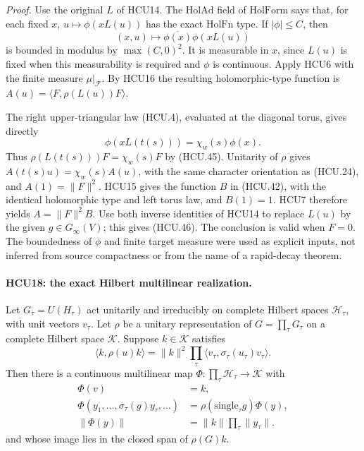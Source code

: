 \emph{Proof.}
Use the original \(L\) of HCU14.
The \(\mathrm{HolAd}\) field of \(\mathrm{HolForm}\) says that, for
each fixed \(x\),
\(u\mapsto\phi(xL(u))\) has the exact \(\mathrm{HolFn}\) type.
If \(|\phi|\le C\), then
\[
 (x,u)\longmapsto\overline{\phi(x)}\phi(xL(u))
 \tag{HCU.47}
\]
is bounded in modulus by \(\max(C,0)^2\).
It is measurable in \(x\), since \(L(u)\) is fixed when this
measurability is required and \(\phi\) is continuous.
Apply HCU6 with the finite measure \(\mu|_{\mathcal F}\).
By HCU16 the resulting holomorphic-type function is
\(A(u)=\langle F,\rho(L(u))F\rangle\).

The right upper-triangular law (HCU.4), evaluated at the diagonal
torus, gives directly
\[
 \phi(xL(t(s)))=\chi_w(s)\phi(x).
\]
Thus \(\rho(L(t(s)))F=\chi_w(s)F\) by (HCU.45).
Unitarity of \(\rho\) gives
\(A(t(s)u)=\chi_w(s)A(u)\), with the same character orientation as
(HCU.24), and \(A(1)=\|F\|^2\).
HCU15 gives the function \(B\) in (HCU.42), with the identical
holomorphic type and left torus law, and \(B(1)=1\).
HCU7 therefore yields \(A=\|F\|^2B\).
Use both inverse identities of HCU14 to replace \(L(u)\) by the
given \(g\in G_\infty(V)\); this gives (HCU.46).
The conclusion is valid when \(F=0\).
The boundedness of \(\phi\) and finite target measure were used as
explicit inputs, not inferred from source compactness or from the
name of a rapid-decay theorem.

\paragraph{HCU18: the exact Hilbert multilinear realization.}
\label{claim:HCU18}
Let \(G_\tau=U(H_\tau)\) act unitarily and irreducibly on complete
Hilbert spaces \(\mathcal H_\tau\), with unit vectors \(v_\tau\).
Let \(\rho\) be a unitary representation of
\(G=\prod_\tau G_\tau\) on a complete Hilbert space \(\mathcal K\).
Suppose \(k\in\mathcal K\) satisfies
\[
 \langle k,\rho(u)k\rangle
  =\|k\|^2\prod_\tau\langle v_\tau,\sigma_\tau(u_\tau)v_\tau\rangle .
 \tag{HCU.48}
\]
Then there is a continuous multilinear map
\(\Phi:\prod_\tau\mathcal H_\tau\to\mathcal K\) with
\[
 \begin{aligned}
 \Phi(v)&=k,\\
 \Phi(y_1,\ldots,\sigma_\tau(g)y_\tau,\ldots)
      &=\rho(\mathrm{single}_\tau g)\Phi(y),\\
 \|\Phi(y)\|&=\|k\|\prod_\tau\|y_\tau\|.
 \end{aligned}
 \tag{HCU.49}
\]
and whose image lies in the closed span of \(\rho(G)k\).

